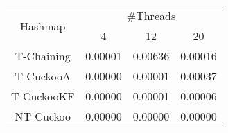 \begin{tabular}{|c|c|c|c|}
\hline
\multirow{2}{*}{Hashmap} & \multicolumn{3}{c|}{\#Threads}\\\cline{2-4}& 4 & 12 & 20\\
\hline
\hline
T-Chaining & 0.00001 & 0.00636 & 0.00016\\
T-CuckooA & 0.00000 & 0.00001 & 0.00037\\
T-CuckooKF & 0.00000 & 0.00001 & 0.00006\\
NT-Cuckoo & 0.00000 & 0.00000 & 0.00000\\
\hline
\end{tabular}
